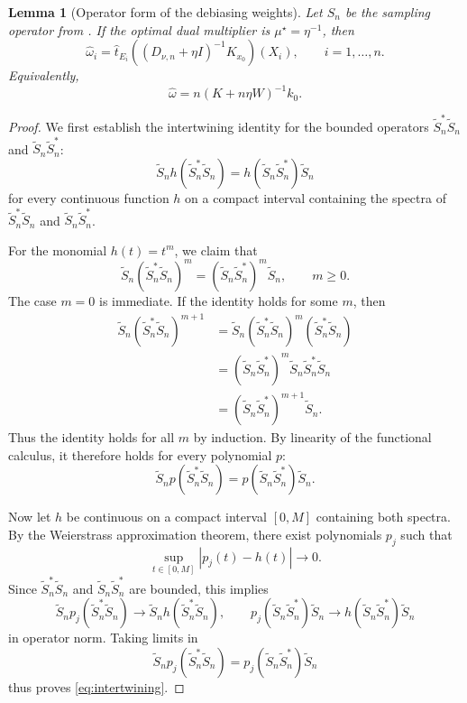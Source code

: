 \documentclass[11pt]{article}
\newtheorem{lemma}{Lemma}[section]
\begin{document}
\begin{lemma}[Operator form of the debiasing weights]
\label{lem:weight_operator_form}
Let $S_n$ be the sampling operator from . 
If the optimal dual multiplier is $\mu^\star=\eta^{-1}$, then
\begin{equation}
 \widehat\omega_i=\widehat t_{E_i}
 \left((D_{\nu,n}+\eta I)^{-1}K_{x_0}\right)(X_i),\qquad i=1,\ldots,n.
 \label{eq:weight_operator_form}
\end{equation}
Equivalently,
\begin{equation}
 \widehat\omega=n(K+n\eta W)^{-1}k_0.
 \label{eq:weight_matrix_form}
\end{equation}
\end{lemma}

\begin{proof}
We first establish the intertwining identity for the bounded operators $\widetilde S_n^*\widetilde S_n$ and $\widetilde S_n\widetilde S_n^*$:
\begin{equation}
  \widetilde S_n h(\widetilde S_n^*\widetilde S_n)
  =
  h(\widetilde S_n\widetilde S_n^*)\widetilde S_n
  \label{eq:intertwining}
\end{equation}
for every continuous function $h$ on a compact interval containing the spectra of
$\widetilde S_n^*\widetilde S_n$ and $\widetilde S_n\widetilde S_n^*$.

For the monomial $h(t)=t^m$, we claim that
\[
  \widetilde S_n(\widetilde S_n^*\widetilde S_n)^m
  =
  (\widetilde S_n\widetilde S_n^*)^m\widetilde S_n,
  \qquad m\ge0.
\]
The case $m=0$ is immediate. If the identity holds for some $m$, then
\begin{align*}
  \widetilde S_n(\widetilde S_n^*\widetilde S_n)^{m+1}
  &=
  \widetilde S_n(\widetilde S_n^*\widetilde S_n)^m(\widetilde S_n^*\widetilde S_n) \\
  &=
  (\widetilde S_n\widetilde S_n^*)^m \widetilde S_n\widetilde S_n^*\widetilde S_n \\
  &=
  (\widetilde S_n\widetilde S_n^*)^{m+1}\widetilde S_n.
\end{align*}
Thus the identity holds for all $m$ by induction. By linearity of the functional
calculus, it therefore holds for every polynomial $p$:
\[
  \widetilde S_np(\widetilde S_n^*\widetilde S_n)
  =
  p(\widetilde S_n\widetilde S_n^*)\widetilde S_n.
\]

Now let $h$ be continuous on a compact interval $[0,M]$ containing both spectra.
By the Weierstrass approximation theorem, there exist polynomials $p_j$ such that
\[
  \sup_{t\in[0,M]}|p_j(t)-h(t)|\to0.
\]
Since $\widetilde S_n^*\widetilde S_n$ and $\widetilde S_n\widetilde S_n^*$ are bounded, this implies
\[
  \widetilde S_np_j(\widetilde S_n^*\widetilde S_n)\to \widetilde S_nh(\widetilde S_n^*\widetilde S_n),
  \qquad
  p_j(\widetilde S_n\widetilde S_n^*)\widetilde S_n\to h(\widetilde S_n\widetilde S_n^*)\widetilde S_n
\]
in operator norm. Taking limits in
\[
  \widetilde S_np_j(\widetilde S_n^*\widetilde S_n)
  =
  p_j(\widetilde S_n\widetilde S_n^*)\widetilde S_n
\]
thus proves \eqref{eq:intertwining}.


\end{proof}
\end{document}
